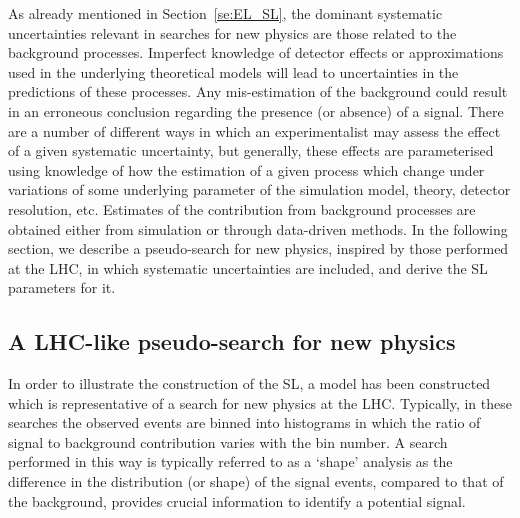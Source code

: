 \documentclass[11pt]{article}
\begin{document}
As already mentioned in Section~\ref{se:EL_SL}, the dominant systematic uncertainties relevant in searches for new physics are those related to the background processes. 
Imperfect knowledge of detector effects or approximations used in the underlying theoretical models will lead to uncertainties in the predictions of these processes.
Any mis-estimation of the background could result in an erroneous conclusion regarding the presence (or absence) of a signal.
There are a number of different ways in which an experimentalist may assess the effect of a given systematic uncertainty, but generally, these effects are parameterised using knowledge of how the estimation of a given process which change under variations of some underlying parameter of the simulation model, theory, detector resolution, etc. Estimates of the contribution from background processes are obtained either from simulation or through  data-driven methods.
In the following section, we describe a pseudo-search for new physics, inspired by those performed at the LHC, in which systematic uncertainties are included, and derive the SL parameters for it.


\subsection{A LHC-like pseudo-search for new physics}
\label{se:toy_search}

In order to illustrate the construction of the SL, a model has been constructed which is representative of a search for new physics at the LHC. Typically, in these searches the observed events are binned into histograms in which the ratio of signal to background contribution varies with the bin number. A search performed in this way is typically referred to as a `shape' analysis as the difference in the distribution (or shape) of the signal events, compared to that of the background, provides crucial information to identify a potential signal.
\end{document}
